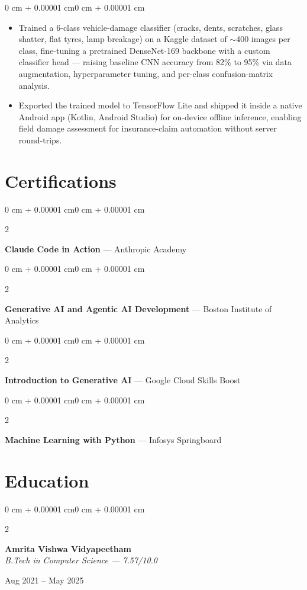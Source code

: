 \documentclass[9pt, letterpaper]{article}
\newenvironment{highlights}{
    \begin{itemize}[
        topsep=0.04 cm,
        parsep=0.04 cm,
        partopsep=0pt,
        itemsep=0pt,
        leftmargin=0 cm + 7pt
    ]
}{
    \end{itemize}
}
\newenvironment{onecolentry}{
    \begin{adjustwidth}{0 cm + 0.00001 cm}{0 cm + 0.00001 cm}
}{
    \end{adjustwidth}
}
\newenvironment{twocolentry}[2][]{
    \onecolentry
    \def\secondColumn{#2}
    \setcolumnwidth{\fill, 4.0 cm}
    \begin{paracol}{2}
}{
    \switchcolumn \raggedleft \secondColumn
    \end{paracol}
    \endonecolentry
}
\begin{document}
\vspace{0.10 cm}

\begin{onecolentry}
    \begin{highlights}
        \item Trained a 6-class vehicle-damage classifier (cracks, dents, scratches, glass shatter, flat tyres, lamp breakage) on a Kaggle dataset of $\sim$400 images per class, fine-tuning a pretrained DenseNet-169 backbone with a custom classifier head --- raising baseline CNN accuracy from 82\% to 95\% via data augmentation, hyperparameter tuning, and per-class confusion-matrix analysis.
        \item Exported the trained model to TensorFlow Lite and shipped it inside a native Android app (Kotlin, Android Studio) for on-device offline inference, enabling field damage assessment for insurance-claim automation without server round-trips.
    \end{highlights}
\end{onecolentry}

\section{Certifications}

\begin{twocolentry}{2026}
    \textbf{Claude Code in Action} --- Anthropic Academy
\end{twocolentry}

\vspace{0.10 cm}

\begin{twocolentry}{2025}
    \textbf{Generative AI and Agentic AI Development} --- Boston Institute of Analytics
\end{twocolentry}

\vspace{0.10 cm}

\begin{twocolentry}{2025}
    \textbf{Introduction to Generative AI} --- Google Cloud Skills Boost
\end{twocolentry}

\vspace{0.10 cm}

\begin{twocolentry}{2024}
    \textbf{Machine Learning with Python} --- Infosys Springboard
\end{twocolentry}

\section{Education}

\begin{twocolentry}{Aug 2021 -- May 2025}
    \textbf{Amrita Vishwa Vidyapeetham} \\
    \textit{B.Tech in Computer Science --- 7.57/10.0}
\end{twocolentry}
\end{document}
